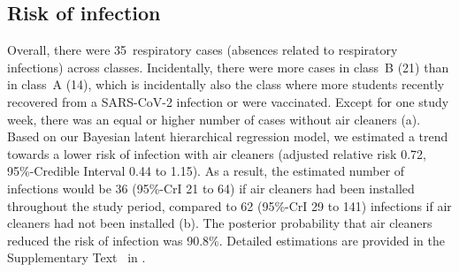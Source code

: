 \documentclass[fleqn,11pt]{wlscirep}
\begin{document}
\subsection{Risk of infection}

Overall, there were 35~respiratory cases (absences related to respiratory infections) across classes. Incidentally, there were more cases in class~B (21) than in class~A (14), which is incidentally also the class where more students recently recovered from a SARS-CoV-2 infection or were vaccinated. Except for one study week, there was an equal or higher number of cases without air cleaners (a). Based on our Bayesian latent hierarchical regression model, we estimated a trend towards a lower risk of infection with air cleaners (adjusted relative risk 0.72, 95\%-Credible Interval 0.44 to 1.15). As a result, the estimated number of infections would be 36 (95\%-CrI 21 to 64) if air cleaners had been installed throughout the study period, compared to 62 (95\%-CrI 29 to 141) infections if air cleaners had not been installed (b). The posterior probability that air cleaners reduced the risk of infection was 90.8\%. Detailed estimations are provided in the Supplementary Text~ in \supp. 
\end{document}

